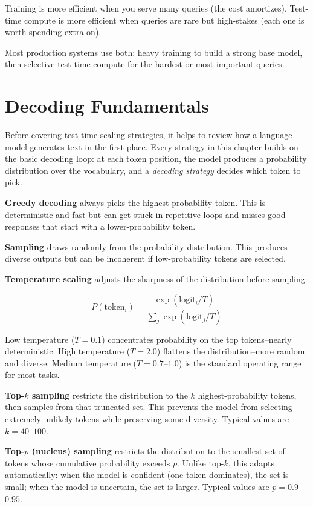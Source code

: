 \begin{chapterenv}
\begin{infobox}
Training is more efficient when you serve many queries (the cost amortizes). Test-time compute is more efficient when queries are rare but high-stakes (each one is worth spending extra on).

Most production systems use both: heavy training to build a strong base model, then selective test-time compute for the hardest or most important queries.
\end{infobox}

\section{Decoding Fundamentals}

Before covering test-time scaling strategies, it helps to review how a language model generates text in the first place. Every strategy in this chapter builds on the basic decoding loop: at each token position, the model produces a probability distribution over the vocabulary, and a \textit{decoding strategy} decides which token to pick.

\textbf{Greedy decoding} always picks the highest-probability token. This is deterministic and fast but can get stuck in repetitive loops and misses good responses that start with a lower-probability token.

\textbf{Sampling} draws randomly from the probability distribution. This produces diverse outputs but can be incoherent if low-probability tokens are selected.

\textbf{Temperature scaling} adjusts the sharpness of the distribution before sampling:

$$P(\text{token}_i) = \frac{\exp(\text{logit}_i / T)}{\sum_j \exp(\text{logit}_j / T)}$$

Low temperature ($T = 0.1$) concentrates probability on the top tokens--nearly deterministic. High temperature ($T = 2.0$) flattens the distribution--more random and diverse. Medium temperature ($T = 0.7$--$1.0$) is the standard operating range for most tasks.

\textbf{Top-$k$ sampling} restricts the distribution to the $k$ highest-probability tokens, then samples from that truncated set. This prevents the model from selecting extremely unlikely tokens while preserving some diversity. Typical values are $k = 40$--$100$.

\textbf{Top-$p$ (nucleus) sampling} restricts the distribution to the smallest set of tokens whose cumulative probability exceeds $p$. Unlike top-$k$, this adapts automatically: when the model is confident (one token dominates), the set is small; when the model is uncertain, the set is larger. Typical values are $p = 0.9$--$0.95$.


\end{chapterenv}
